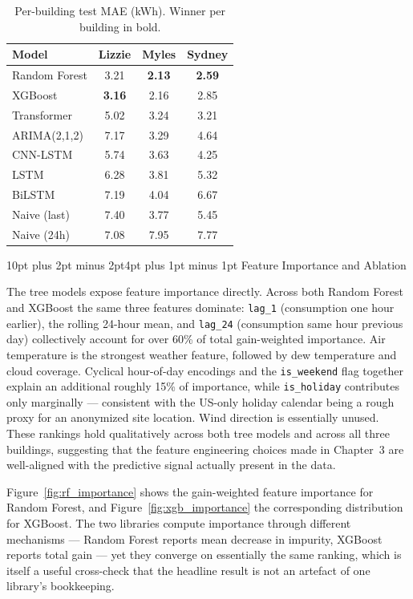 \documentclass[12pt,a4paper,openany]{report}
\makeatletter
\renewcommand{\section}{\@startsection{section}{1}{\z@}%
  {10pt plus 2pt minus 2pt}{4pt plus 1pt minus 1pt}%
  {\normalfont\normalsize\bfseries}}
\makeatother
\begin{document}
\begin{table}[!htb]
\centering
\caption{Per-building test MAE (kWh). Winner per building in bold.}
\label{tab:per_building}
\begin{tabular}{|l|c|c|c|}
\hline
\textbf{Model} & \textbf{Lizzie} & \textbf{Myles} & \textbf{Sydney} \\
\hline
Random Forest & 3.21 & \textbf{2.13} & \textbf{2.59} \\
XGBoost & \textbf{3.16} & 2.16 & 2.85 \\
Transformer & 5.02 & 3.24 & 3.21 \\
ARIMA(2,1,2) & 7.17 & 3.29 & 4.64 \\
CNN-LSTM & 5.74 & 3.63 & 4.25 \\
LSTM & 6.28 & 3.81 & 5.32 \\
BiLSTM & 7.19 & 4.04 & 6.67 \\
Naive (last) & 7.40 & 3.77 & 5.45 \\
Naive (24h) & 7.08 & 7.95 & 7.77 \\
\hline
\end{tabular}
\end{table}

\section{Feature Importance and Ablation}

The tree models expose feature importance directly. Across both Random Forest and XGBoost the same three features dominate: \texttt{lag\_1} (consumption one hour earlier), the rolling 24-hour mean, and \texttt{lag\_24} (consumption same hour previous day) collectively account for over 60\% of total gain-weighted importance. Air temperature is the strongest weather feature, followed by dew temperature and cloud coverage. Cyclical hour-of-day encodings and the \texttt{is\_weekend} flag together explain an additional roughly 15\% of importance, while \texttt{is\_holiday} contributes only marginally --- consistent with the US-only holiday calendar being a rough proxy for an anonymized site location. Wind direction is essentially unused. These rankings hold qualitatively across both tree models and across all three buildings, suggesting that the feature engineering choices made in Chapter~3 are well-aligned with the predictive signal actually present in the data.

Figure~\ref{fig:rf_importance} shows the gain-weighted feature importance for Random Forest, and Figure~\ref{fig:xgb_importance} the corresponding distribution for XGBoost. The two libraries compute importance through different mechanisms --- Random Forest reports mean decrease in impurity, XGBoost reports total gain --- yet they converge on essentially the same ranking, which is itself a useful cross-check that the headline result is not an artefact of one library's bookkeeping.
\end{document}
